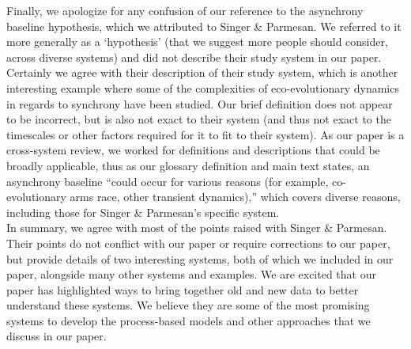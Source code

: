 \documentclass[11pt,letter]{article}
\begin{document}
Finally, we apologize for any confusion of our reference to the asynchrony baseline hypothesis, which we attributed to Singer \& Parmesan. We referred to it more generally as a `hypothesis' (that we suggest more people should consider, across diverse systems) and did not describe their study system in our paper. Certainly we agree with their description of their study system, which is another interesting example where some of the complexities of eco-evolutionary dynamics in regards to synchrony have been studied. Our brief definition does not appear to be incorrect, but is also not exact to their system (and thus not exact to the timescales or other factors required for it to fit to their system).  As our paper is a cross-system review, we worked for definitions and descriptions that could be broadly applicable, thus as our glossary definition and main text states, an asynchrony baseline ``could occur for various reasons (for example, co-evolutionary arms race, other transient dynamics),'' which covers diverse reasons, including those for Singer \& Parmesan's specific system.\\

In summary, we agree with most of the points raised with Singer \& Parmesan. Their points do not conflict with our paper or require corrections to our paper, but provide details of two interesting systems, both of which we included in our paper, alongside many other systems and examples. We are excited that our paper has highlighted ways to bring together old and new data to better understand these systems. We believe they are some of the most promising systems to develop the process-based models and other approaches that we discuss in our paper. 

\begin{footnotesize}

\end{footnotesize}
\end{document}
